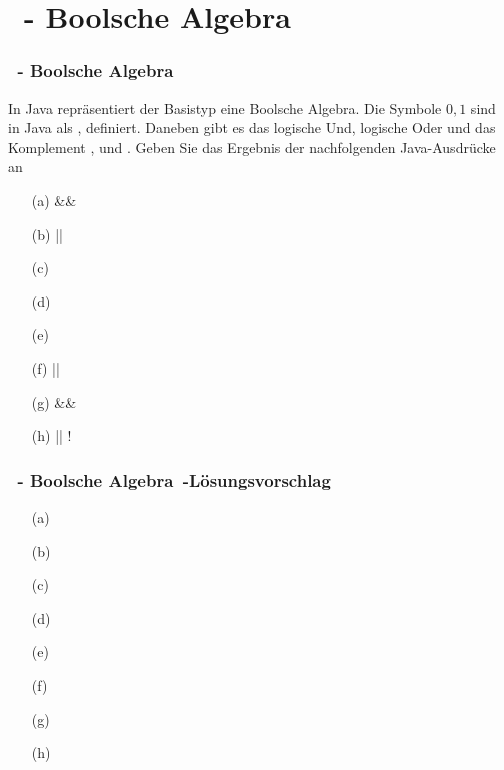 \def\stitle{\theexercise\ - Boolsche Algebra}
\section{\stitle}
\begin{frame}[t]
  \frametitle{\stitle}


In Java repräsentiert der Basistyp  eine Boolsche Algebra.
Die Symbole $0, 1$ sind in Java als ,  definiert.
Daneben gibt es das logische Und, logische Oder und das Komplement \code{\&\&}, \code{||} und \code{!}.
Geben Sie das Ergebnis der nachfolgenden Java-Ausdrücke an
\medskip

\begin{minipage}{0.49\textwidth}
\begin{itemize}
\item[(a)]  \&\& 
\item[(b)]  || 
\item[(c)] 
\item[(d)] 
\end{itemize}
\end{minipage}
\begin{minipage}{0.49\textwidth}
\begin{itemize}
\item[(e)] 
\item[(f)]  || 
\item[(g)]  \&\& 
\item[(h)]  || !
\end{itemize}
\end{minipage}
\end{frame}

\begin{frame}[t]
  \frametitle{\stitle\ -L\"osungsvorschlag}
\begin{center}
\begin{minipage}{0.49\textwidth}
\begin{itemize}
\item[(a)] 
\item[(b)] 
\item[(c)] 
\item[(d)] 
\end{itemize}
\end{minipage}
\begin{minipage}{0.49\textwidth}
\begin{itemize}
\item[(e)] 
\item[(f)] 
\item[(g)] 
\item[(h)] 
\end{itemize}
\end{minipage}
\end{center}

\end{frame}
